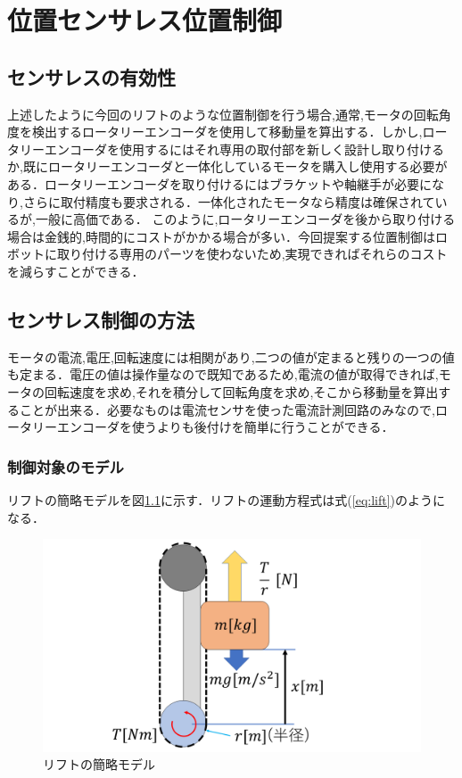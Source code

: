 \chapter{位置センサレス位置制御}

\section{センサレスの有効性}上述したように今回のリフトのような位置制御を行う場合,通常,モータの回転角度を検出するロータリーエンコーダを使用して移動量を算出する．しかし,ロータリーエンコーダを使用するにはそれ専用の取付部を新しく設計し取り付けるか,既にロータリーエンコーダと一体化しているモータを購入し使用する必要がある．ロータリーエンコーダを取り付けるにはブラケットや軸継手が必要になり,さらに取付精度も要求される．一体化されたモータなら精度は確保されているが,一般に高価である．
このように,ロータリーエンコーダを後から取り付ける場合は金銭的,時間的にコストがかかる場合が多い．今回提案する位置制御はロボットに取り付ける専用のパーツを使わないため,実現できればそれらのコストを減らすことができる．

\section{センサレス制御の方法}
モータの電流,電圧,回転速度には相関があり,二つの値が定まると残りの一つの値も定まる．電圧の値は操作量なので既知であるため,電流の値が取得できれば,モータの回転速度を求め,それを積分して回転角度を求め,そこから移動量を算出することが出来る．必要なものは電流センサを使った電流計測回路のみなので,ロータリーエンコーダを使うよりも後付けを簡単に行うことができる．

\subsection{制御対象のモデル}
リフトの簡略モデルを図\ref{fig:liftModel}に示す．リフトの運動方程式は式(\ref{eq:lift})のようになる．

\begin{figure}[htbp]
  \begin{center}
    \includegraphics[width=170mm]{img/liftModel.png}
    \end{center}
  \caption{リフトの簡略モデル}
 \label{fig:liftModel}
\end{figure}


